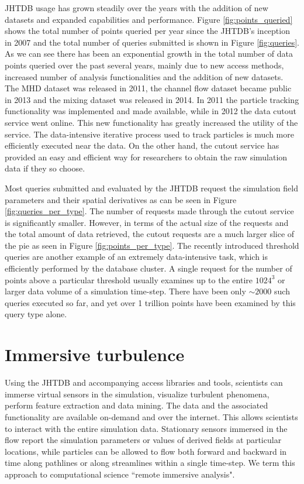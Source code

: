 \documentclass[10pt,twocolumn]{article}
\begin{document}
JHTDB usage has grown steadily over the years with the addition of new datasets and expanded capabilities and performance. Figure \ref{fig:points_queried}
shows the total number of points queried per year since the JHTDB's inception in 2007 and the total number of queries submitted is shown in Figure
\ref{fig:queries}. As we can see there has been an exponential growth in the total number of data points queried over the past several years, mainly due to
new access methods, increased number of analysis functionalities and the addition of new datasets. 
The MHD dataset was released in 2011, the channel flow dataset
became public in 2013 and the mixing dataset was released in 2014. In 2011 the particle tracking functionality was implemented and made available, while
in 2012 the data cutout service went online. This new functionality has greatly increased the utility of the service. The data-intensive iterative process used to
track particles is much more efficiently executed near the data. On the other hand, the cutout service has provided an easy and efficient way for researchers to
obtain the raw simulation data if they so choose. 

Most queries submitted and evaluated by the JHTDB request the simulation field parameters and their spatial derivatives as can be seen in Figure
\ref{fig:queries_per_type}. The number of requests made through the cutout service is significantly smaller. However, in terms of the actual size of the requests
and the total amount of data retrieved, the cutout requests are a much larger slice of the pie as seen in Figure \ref{fig:points_per_type}. The recently introduced
threshold queries are another example of an extremely data-intensive task, which is efficiently performed by the database cluster. A single request for the 
number of points above a particular threshold usually examines up to the entire $1024^3$ or larger data volume of a simulation time-step. 
There have been only $\sim2000$ such queries executed so far, and yet over 1 trillion points have been examined by this query type alone.

\section{Immersive turbulence}
Using the JHTDB and accompanying access libraries and tools, scientists can immerse virtual sensors in the simulation, visualize turbulent phenomena, 
perform feature extraction and data mining. The data and the associated functionality are available on-demand and over the internet. This allows scientists 
to interact with the entire simulation data. Stationary sensors immersed in the flow report the simulation parameters or values of derived fields at particular 
locations, while particles can be allowed to flow both forward and backward in time along pathlines or along streamlines within a single time-step. 
We term this approach to computational science ``remote immersive analysis".
\end{document}

